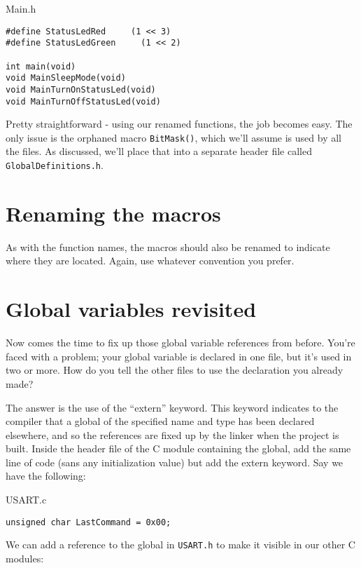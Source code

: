 \documentclass[a4paper,oneside]{book}
\begin{document}
Main.h
\begin{center}
\begin{lstlisting}
#define StatusLedRed     (1 << 3)
#define StatusLedGreen     (1 << 2)

int main(void)
void MainSleepMode(void)
void MainTurnOnStatusLed(void)
void MainTurnOffStatusLed(void)
\end{lstlisting}
\end{center}

Pretty straightforward - using our renamed functions, the job becomes easy. The only issue is the orphaned macro \texttt{BitMask()}, which we'll assume is used by all the files. As discussed, we'll place that into a separate header file called \texttt{GlobalDefinitions.h}.

\section{Renaming the macros}

As with the function names, the macros should also be renamed to indicate where they are located. Again, use whatever convention you prefer.

\section{Global variables revisited}

Now comes the time to fix up those global variable references from before. You're faced with a problem; your global variable is declared in one file, but it's used in two or more. How do you tell the other files to use the declaration you already made?

The answer is the use of the ``extern'' keyword. This keyword indicates to the compiler that a global of the specified name and type has been declared elsewhere, and so the references are fixed up by the linker when the project is built. Inside the header file of the C module containing the global, add the same line of code (sans any initialization value) but add the extern keyword. Say we have the following:

USART.c
\begin{center}
\begin{lstlisting}
unsigned char LastCommand = 0x00;
\end{lstlisting}
\end{center}

We can add a reference to the global in \texttt{USART.h} to make it visible in our other C modules:
\end{document}

